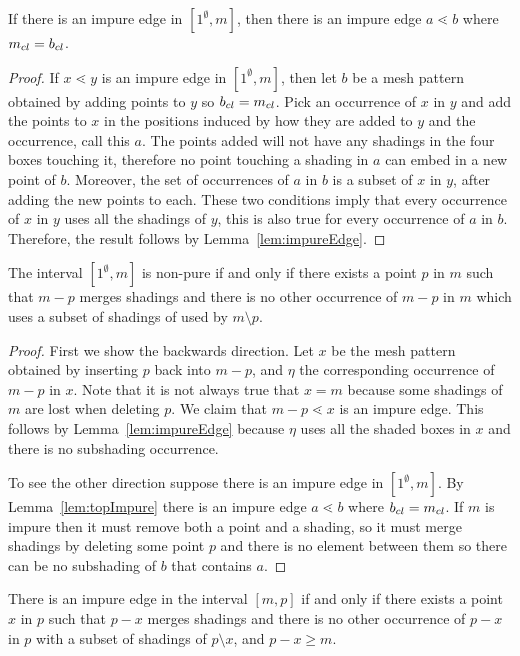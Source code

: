 \documentclass[11pt,a4paper,oneside]{article}
\begin{document}
\begin{lem}\label{lem:topImpure}
If there is an impure edge in $[1^\emptyset,m]$, then there is an impure edge
$a\lessdot b$ where $m_{cl}=b_{cl}$.
\begin{proof}
If $x\lessdot y$ is an impure edge in $[1^\emptyset,m]$, then let $b$ be a mesh
pattern obtained by adding points to $y$ so $b_{cl} = m_{cl}$. Pick
an occurrence of $x$ in $y$ and add the points to $x$ in the positions induced by
how they are added to $y$ and the occurrence, call this $a$. The points added
will not have any shadings in the four boxes touching it, therefore no point
touching a shading in $a$ can embed in a new point of $b$. Moreover, the set of
occurrences of $a$ in $b$ is a subset of $x$ in $y$, after adding the new points
to each. These two conditions imply that every occurrence of $x$ in $y$ uses
all the shadings of $y$, this is also true for every occurrence of $a$ in $b$.
Therefore, the result follows by Lemma~\ref{lem:impureEdge}.
\end{proof}
\end{lem}

\begin{prop}
The interval $[1^\emptyset,m]$ is non-pure if and
only if there exists a point $p$ in $m$ such that $m-p$ merges shadings and
there is no other occurrence of $m-p$ in $m$ which uses a subset of shadings of
used by $m\setminus p$.
\begin{proof}
First we show the backwards direction. Let $x$  be the mesh pattern obtained by
inserting $p$ back into $m-p$, and $\eta$ the corresponding occurrence of $m-p$
in $x$. Note that it is not always true that $x=m$ because some shadings
of $m$ are lost when deleting $p$. We claim that $m-p\lessdot x$ is an impure
edge. This follows by Lemma~\ref{lem:impureEdge} because $\eta$ uses all the
shaded boxes in $x$ and there is no subshading occurrence.

To see the other direction suppose there is an impure edge in $[1^{\emptyset},m]$. By
Lemma~\ref{lem:topImpure} there is an impure edge $a\lessdot b$ where
$b_{cl}=m_{cl}$. If $m$ is impure then it must remove both a point and a shading,
so it must merge shadings by deleting some point $p$ and there is no element
between them so there can be no subshading of $b$ that contains $a$.
\end{proof}
\end{prop}

\begin{cor}
There is an impure edge in the interval $[m,p]$ if and only if there exists a
point $x$ in $p$ such that $p-x$ merges shadings and there is no other
occurrence of $p-x$ in $p$ with a subset of shadings of $p\setminus x$, and
$p-x\ge m$.
\end{cor}
\end{document}
